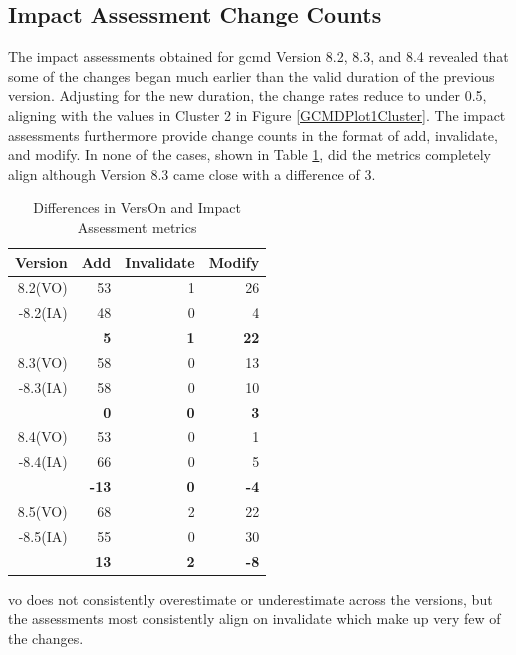 \subsection{Impact Assessment Change Counts}

The impact assessments obtained for \gls{gcmd} Version 8.2, 8.3, and 8.4 revealed that some of the \glspl{change} began much earlier than the valid duration of the previous \gls{version}.
Adjusting for the new duration, the change rates reduce to under 0.5, aligning with the values in Cluster 2 in Figure \ref{GCMDPlot1Cluster}.
The impact assessments furthermore provide change counts in the format of \gls{add}, \gls{invalidate}, and \gls{modify}.
In none of the cases, shown in Table \ref{table:GCMD_metric}, did the metrics completely align although Version 8.3 came close with a difference of 3.
\begin{table}
	\caption{Differences in VersOn and Impact Assessment metrics}
	\label{table:GCMD_metric}
	\centering
	\begin{tabular}{|r|r|r|r|}
		\hline
		Version & Add & Invalidate & Modify\\ \hline
		8.2(VO)&	53&	1&	26\\
		-8.2(IA)&	48&	0&	4\\
		\hline
		&	\textbf{5}&	\textbf{1}&	\textbf{22}\\
		\hline
		8.3(VO)&	58&	0&	13\\
		-8.3(IA)&	58&	0&	10\\
		\hline
		&	\textbf{0}&	\textbf{0}&	\textbf{3}\\
		\hline
		8.4(VO)&	53&	0&	1\\
		-8.4(IA)&	66&	0&	5\\
		\hline
		&	\textbf{-13}&	\textbf{0}&	\textbf{-4}\\
		\hline
		8.5(VO)&	68&	2&	22\\
		-8.5(IA)&	55&	0&	30\\
		\hline
		&	\textbf{13}&	\textbf{2}&	\textbf{-8}\\						
		\hline
	\end{tabular}
\end{table}
\gls{vo} does not consistently overestimate or underestimate across the \glspl{version}, but the assessments most consistently align on \gls{invalidate} which make up very few of the \glspl{change}.


